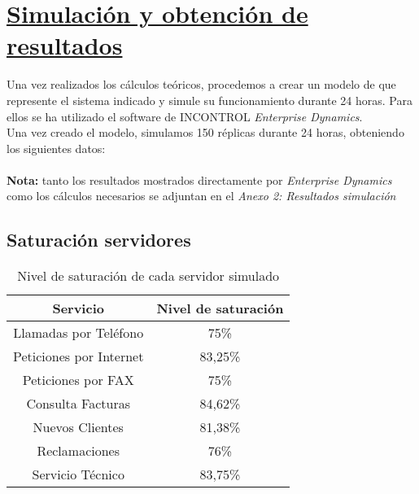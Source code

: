 \section{\textbf{\underline{Simulación y obtención de resultados}}}
Una vez realizados los cálculos teóricos, procedemos a crear un modelo de que represente el sistema indicado y simule su funcionamiento durante 24 horas. Para ellos se ha utilizado el software de INCONTROL \textit{Enterprise Dynamics}.\\ 
Una vez creado el modelo, simulamos 150 réplicas durante 24 horas, obteniendo los siguientes datos:\\\\
\textbf{Nota: }tanto los resultados mostrados directamente por \textit{Enterprise Dynamics} como los cálculos necesarios se adjuntan en el \textit{Anexo 2: Resultados simulación}
\subsection{Saturación servidores}
\begin{table}[H]
  \begin{center}
  \begin{tabular}{|c|c|}
    \hline
    \textbf{Servicio}       & \textbf{Nivel de saturación} \\ \hline
    Llamadas por Teléfono   & 75\%                   \\ \hline
    Peticiones por Internet & 83,25\%                  \\ \hline
    Peticiones por FAX      & 75\%                   \\ \hline
    Consulta Facturas      & 84,62\%                   \\ \hline
    Nuevos Clientes      & 81,38\%                   \\ \hline
    Reclamaciones      & 76\%                   \\ \hline
    Servicio Técnico      & 83,75\%                  \\ \hline
  \end{tabular}
\end{center}
  \caption{Nivel de saturación de cada servidor simulado}
  \end{table}
